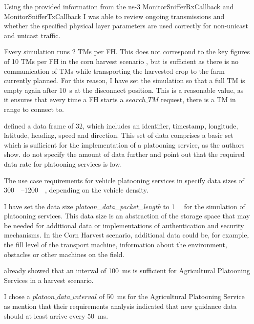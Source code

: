 Using the provided information from the ns-3 MonitorSnifferRxCallback and MonitorSnifferTxCallback I was able to review ongoing transmissions and
whether the specified physical layer parameters are used correctly for non-unicast and unicast traffic.

Every simulation runs \num{2} \acp{TM} per \ac{FH}.
This does not correspond to the key figures of 10 \acp{TM} per \ac{FH} in the corn harvest scenario \cite{faustzahlen2018},
but is sufficient as there is no communication of \acp{TM} while transporting the harvested crop to the farm currently planned.
For this reason, I have set the simulation so that a full \ac{TM} is empty again after \SI{10}{\second} at the disconnect position.
This is a reasonable value, as it ensures that every time a \ac{FH} starts a $search\_TM$ request, there is a \ac{TM} in range to connect to.

\textcite{zhang_method_2009} defined a data frame of \SI{32}{\byte}, which includes an identifier, timestamp, longitude,
latitude, heading, speed and direction.
This set of data comprises a basic set which is sufficient for the implementation of a platooning service,
as the authors show.
\textcite{schlingmann_aef_2019} do not specify the amount of data further and point out that the required data rate
for platooning services is low.

The use case requirements for vehicle platooning services in \cite{TR-22.886} specify data sizes of \SIrange{300}{1200}{\kilo\byte},
depending on the vehicle density.

I have set the data size \textit{platoon\_data\_packet\_length} to \SI{1}{\kilo\byte} for the simulation of platooning services.
This data size is an abstraction of the storage space that may be needed for additional data or implementations
of authentication and security mechanisms.
In the Corn Harvest scenario, additional data could be, for example, the fill level of the transport machine,
information about the environment, obstacles or other machines on the field.

\textcite{zhang_method_2009} already showed that an interval of \SI{100}{\milli\second} is sufficient for Agricultural Platooning Services
in a harvest scenario.

I chose a $platoon\_data\_interval$ of \SI{50}{\milli\second} for the Agricultural Platooning Service
as \textcite{smolnik_5g_2020} mention that their requirements analysis indicated that new guidance data should at least arrive every \SI{50}{\milli\second}.

